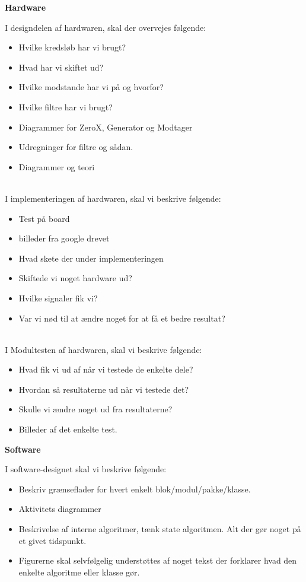 \documentclass[11pt]{article}
\begin{document}
\textbf{Hardware}


I designdelen af hardwaren, skal der overvejes følgende:

\begin{itemize}
	\item Hvilke kredsløb har vi brugt? 
	\item Hvad har vi skiftet ud?
	\item Hvilke modstande har vi på og hvorfor?
	\item Hvilke filtre har vi brugt? 
	\item Diagrammer for ZeroX, Generator og Modtager
	\item Udregninger for filtre og sådan.
	\item Diagrammer og teori
\end{itemize}

\\
I implementeringen af hardwaren, skal vi beskrive følgende:

\begin{itemize}
	\item Test på board
	\item billeder fra google drevet
	\item Hvad skete der under implementeringen
	\item Skiftede vi noget hardware ud?
	\item Hvilke signaler fik vi?
	\item Var vi nød til at ændre noget for at få et bedre resultat?
\end{itemize}

\\
I Modultesten af hardwaren, skal vi beskrive følgende:

\begin{itemize}
	\item Hvad fik vi ud af når vi testede de enkelte dele?
	\item Hvordan så resultaterne ud når vi testede det?
	\item Skulle vi ændre noget ud fra resultaterne?
	\item Billeder af det enkelte test.
\end{itemize}

\textbf{Software}

I software-designet skal vi beskrive følgende:

\begin{itemize}
	\item Beskriv grænseflader for hvert enkelt blok/modul/pakke/klasse.
	\item Aktivitets diagrammer
	\item Beskrivelse af interne algoritmer, tænk state algoritmen. Alt der gør noget på et givet tidspunkt.
	\item Figurerne skal selvfølgelig understøttes af noget tekst der forklarer hvad den enkelte algoritme eller klasse gør.
\end{itemize}
\end{document}

